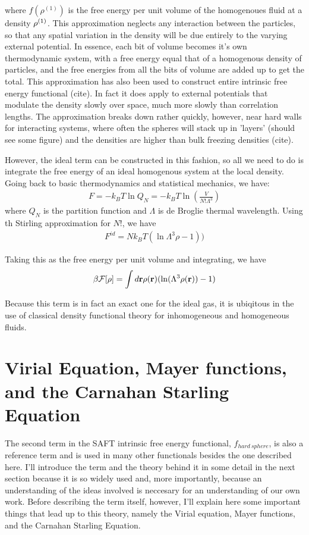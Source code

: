 where $f(\rho^{(1)})$ is the free energy per unit volume of the
homogenoues fluid at a density $\rho^{(1)}$.  This approximation neglects any
interaction between the particles, so that any spatial variation in
the density will be due entirely to the varying external potential.
In essence, each bit of volume becomes it's own thermodynamic system,
with a free energy equal that of a homogenous density of particles,
and the free energies from all the bits of volume are added up to get
the total.  This approximation has also been used to construct entire
intrinsic free energy functional (cite). In fact it does apply to
external potentials that modulate the density slowly over space, much
more slowly than correlation lengths.  The approximation breaks down
rather quickly, however, near hard walls for interacting systems,
where often the spheres will stack up in 'layers' (should see some
figure) and the densities are higher than bulk freezing densities
(cite).

However, the ideal term can be constructed in this fashion, so all we
need to do is integrate the free energy of an ideal homogenous system
at the local density.  Going back to basic thermodynamics and
statistical mechanics, we have:
\begin{align}
  F = -k_BT \ln Q_N = -k_BT \ln (\frac{V}{N!\Lambda^3})
\end{align}
where $Q_N$ is the partition function and $\Lambda$ is de Broglie
thermal wavelength.  Using th Stirling approximation for $N!$, we have
\begin{align}
F^{id} = Nk_BT(\ln \Lambda^3 \rho - 1))
\end{align}

Taking this as the free energy per unit volume and integrating, we
have
\begin{align}
  \beta \mathcal{F}[\rho] = \int d\textbf{r} \rho(\textbf{r})(\ln (\Lambda^3\rho(\textbf{r}))-1)
\end{align}

Because this term is in fact an exact one for the ideal gas, it is
ubiqitous in the use of classical density functional theory for
inhomogeneous and homogeneous fluids.

\clearpage
\newpage

\section{Virial Equation, Mayer functions, and the Carnahan Starling Equation}

The second term in the SAFT intrinsic free energy functional,
$f_{hard~sphere}$, is also a reference term and is used in many other
functionals besides the one described here.  I'll introduce the term
and the theory behind it in some detail in the next section because it
is so widely used and, more importantly, because an understanding of
the ideas involved is neccesary for an understanding of our own work.
Before describing the term itself, however, I'll explain here some
important things that lead up to this theory, namely the Virial
equation, Mayer functions, and the Carnahan Starling Equation.

